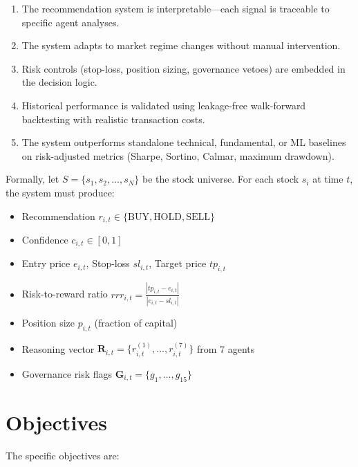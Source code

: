 \documentclass[12pt,a4paper]{report}
\begin{document}
\begin{enumerate}
    \item The recommendation system is interpretable---each signal is traceable to specific agent analyses.
    \item The system adapts to market regime changes without manual intervention.
    \item Risk controls (stop-loss, position sizing, governance vetoes) are embedded in the decision logic.
    \item Historical performance is validated using leakage-free walk-forward backtesting with realistic transaction costs.
    \item The system outperforms standalone technical, fundamental, or ML baselines on risk-adjusted metrics (Sharpe, Sortino, Calmar, maximum drawdown).
\end{enumerate}

Formally, let $S = \{s_1, s_2, ..., s_N\}$ be the stock universe. For each stock $s_i$ at time $t$, the system must produce:
\begin{itemize}
    \item Recommendation $r_{i,t} \in \{\text{BUY}, \text{HOLD}, \text{SELL}\}$
    \item Confidence $c_{i,t} \in [0, 1]$
    \item Entry price $e_{i,t}$, Stop-loss $sl_{i,t}$, Target price $tp_{i,t}$
    \item Risk-to-reward ratio $rrr_{i,t} = \frac{|tp_{i,t} - e_{i,t}|}{|e_{i,t} - sl_{i,t}|}$
    \item Position size $p_{i,t}$ (fraction of capital)
    \item Reasoning vector $\mathbf{R}_{i,t} = \{r^{(1)}_{i,t}, ..., r^{(7)}_{i,t}\}$ from 7 agents
    \item Governance risk flags $\mathbf{G}_{i,t} = \{g_1, ..., g_{15}\}$
\end{itemize}

\section{Objectives}
The specific objectives are:
\end{document}

